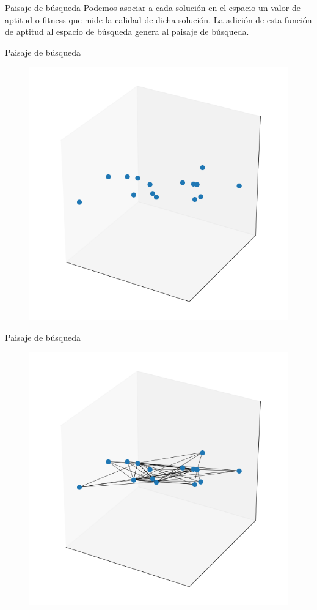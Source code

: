 \documentclass[11pt]{beamer}
\begin{document}
\begin{frame}{Paisaje de búsqueda}
Podemos asociar a cada solución en el espacio un valor de aptitud o fitness que mide la calidad de dicha solución. La adición de esta función de aptitud al espacio de búsqueda genera al paisaje de búsqueda.
\end{frame}


\begin{frame}{Paisaje de búsqueda}
\begin{figure}
\includegraphics[scale=.4]{search1.png}
\end{figure}
\end{frame}


\begin{frame}{Paisaje de búsqueda}
\begin{figure}
\includegraphics[scale=.4]{search2.png}
\end{figure}
\end{frame}
\end{document}
